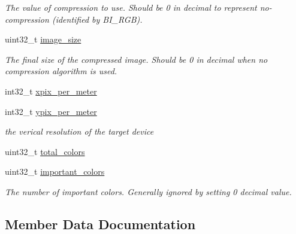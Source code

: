 \begin{DoxyCompactItemize}
\begin{DoxyCompactList}\small\item\em The value of compression to use. Should be \textquotesingle{}0\textquotesingle{} in decimal to represent no-\/compression (identified by \textquotesingle{}B\+I\+\_\+\+R\+GB\textquotesingle{}). \end{DoxyCompactList}\item 
uint32\+\_\+t \hyperlink{struct__sbmp__iinfo__data_a082209466a202c16553d5b83057173a1}{image\+\_\+size}
\begin{DoxyCompactList}\small\item\em The final size of the compressed image. Should be \textquotesingle{}0\textquotesingle{} in decimal when no compression algorithm is used. \end{DoxyCompactList}\item 
int32\+\_\+t \hyperlink{struct__sbmp__iinfo__data_a83e771acd1d30910dcab7e2410facfcf}{xpix\+\_\+per\+\_\+meter}
\item 
int32\+\_\+t \hyperlink{struct__sbmp__iinfo__data_adee64a3daa366c744c5c6a2b860e15ef}{ypix\+\_\+per\+\_\+meter}
\begin{DoxyCompactList}\small\item\em the verical resolution of the target device \end{DoxyCompactList}\item 
uint32\+\_\+t \hyperlink{struct__sbmp__iinfo__data_ae98e4efd2018a77bec4dc4c052d8b668}{total\+\_\+colors}
\item 
uint32\+\_\+t \hyperlink{struct__sbmp__iinfo__data_acb5f152cfc721f5cb966777410db21c1}{important\+\_\+colors}
\begin{DoxyCompactList}\small\item\em The number of important colors. Generally ignored by setting \textquotesingle{}0\textquotesingle{} decimal value. \end{DoxyCompactList}\end{DoxyCompactItemize}


\subsection{Member Data Documentation}
\mbox{\label{struct__sbmp__iinfo__data_a2cc104e8b5f4309450247ca139d34dd5}} 
